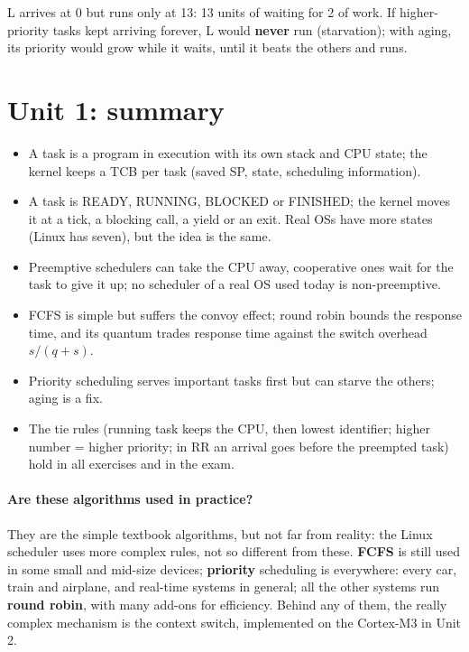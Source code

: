 L arrives at 0 but runs only at 13: 13 units of waiting for 2 of work. If higher-priority tasks kept arriving forever, L would \textbf{never} run (starvation); with aging, its priority would grow while it waits, until it beats the others and runs.

\section{Unit 1: summary}
\begin{itemize}
    \item A task is a program in execution with its own stack and CPU state; the kernel keeps a TCB per task (saved SP, state, scheduling information).
    \item A task is READY, RUNNING, BLOCKED or FINISHED; the kernel moves it at a tick, a blocking call, a yield or an exit. Real OSs have more states (Linux has seven), but the idea is the same.
    \item Preemptive schedulers can take the CPU away, cooperative ones wait for the task to give it up; no scheduler of a real OS used today is non-preemptive.
    \item FCFS is simple but suffers the convoy effect; round robin bounds the response time, and its quantum trades response time against the switch overhead $s/(q+s)$.
    \item Priority scheduling serves important tasks first but can starve the others; aging is a fix.
    \item The tie rules (running task keeps the CPU, then lowest identifier; higher number = higher priority; in RR an arrival goes before the preempted task) hold in all exercises and in the exam.
\end{itemize}

\paragraph{Are these algorithms used in practice?} They are the simple textbook algorithms, but not far from reality: the Linux scheduler uses more complex rules, not so different from these. \textbf{FCFS} is still used in some small and mid-size devices; \textbf{priority} scheduling is everywhere: every car, train and airplane, and real-time systems in general; all the other systems run \textbf{round robin}, with many add-ons for efficiency. Behind any of them, the really complex mechanism is the context switch, implemented on the Cortex-M3 in Unit 2.



